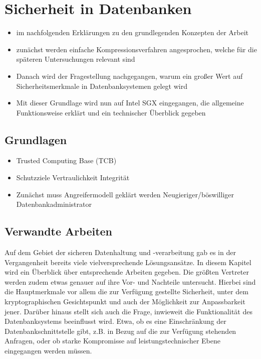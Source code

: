 
\chapter{Sicherheit in Datenbanken}
\begin{itemize}
	\item im nachfolgenden Erklärungen zu den grundlegenden Konzepten der Arbeit
	\item zunächst werden einfache Kompressionsverfahren angesprochen, welche für die späteren Untersuchungen relevant sind
	\item Danach wird der Fragestellung nachgegangen, warum ein großer Wert auf Sicherheitsmerkmale in Datenbanksystemen gelegt wird
	\item Mit dieser Grundlage wird nun auf Intel SGX eingegangen, die allgemeine Funktionsweise erklärt und ein technischer Überblick gegeben
\end{itemize}

\section{Grundlagen}
\begin{itemize}
	\item Trusted Computing Base (TCB) %
	\item Schutzziele
	\subitem Vertraulichkeit
	\subitem Integrität
	\item Zunächst muss Angreifermodell geklärt werden
	\subitem Neugieriger/böswilliger Datenbankadministrator
\end{itemize}

\section{Verwandte Arbeiten}
Auf dem Gebiet der sicheren Datenhaltung und -verarbeitung gab es in der Vergangenheit bereits viele vielversprechende Lösungsansätze. In diesem Kapitel wird ein Überblick über entsprechende Arbeiten gegeben. Die größten Vertreter werden zudem etwas genauer auf ihre Vor- und Nachteile untersucht. Hierbei sind die Hauptmerkmale vor allem die zur Verfügung gestellte Sicherheit, unter dem kryptographischen Gesichtspunkt und auch der Möglichkeit zur Anpassbarkeit jener. Darüber hinaus stellt sich auch die Frage, inwieweit die Funktionalität des Datenbanksystems beeinflusst wird. Etwa, ob es eine Einschränkung der Datenbankschnittstelle gibt, z.B. in Bezug auf die zur Verfügung stehenden Anfragen, oder ob starke Kompromisse auf leistungstechnischer Ebene eingegangen werden müssen.

